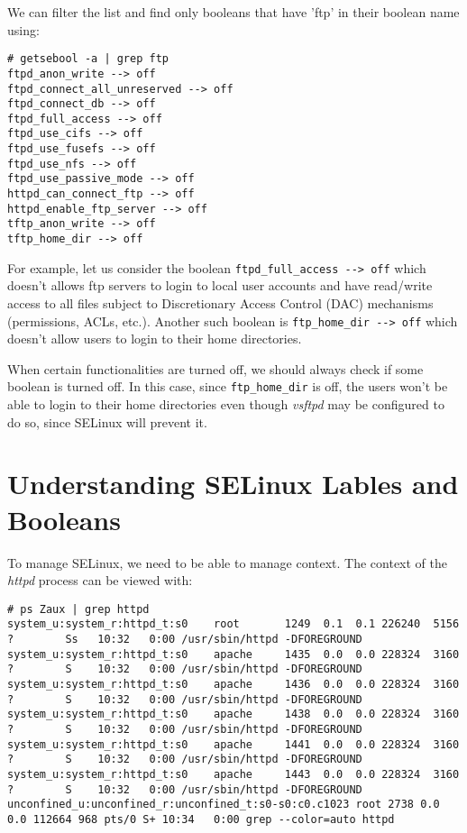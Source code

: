 \noindent
We can filter the list and find only booleans that have 'ftp' in their boolean name using:

\vspace{-15pt}
\begin{verbatim}
# getsebool -a | grep ftp
ftpd_anon_write --> off
ftpd_connect_all_unreserved --> off
ftpd_connect_db --> off
ftpd_full_access --> off
ftpd_use_cifs --> off
ftpd_use_fusefs --> off
ftpd_use_nfs --> off
ftpd_use_passive_mode --> off
httpd_can_connect_ftp --> off
httpd_enable_ftp_server --> off
tftp_anon_write --> off
tftp_home_dir --> off
\end{verbatim}
\vspace{-10pt}

\noindent
For example, let us consider the boolean \verb|ftpd_full_access --> off| which doesn't allows ftp servers to login to local user accounts and have read/write access to all files subject to Discretionary Access Control (DAC) mechanisms (permissions, ACLs, etc.). Another such boolean is \verb|ftp_home_dir --> off| which doesn't allow users to login to their home directories. 

When certain functionalities are turned off, we should always check if some boolean is turned off. In this case, since \verb|ftp_home_dir| is off, the users won't be able to login to their home directories even though \textit{vsftpd} may be configured to do so, since SELinux will prevent it. 

\section{Understanding SELinux Lables and Booleans}
To manage SELinux, we need to be able to manage context. The context of the \textit{httpd} process can be viewed with:

\vspace{-15pt}
\begin{verbatim}
# ps Zaux | grep httpd
system_u:system_r:httpd_t:s0    root       1249  0.1  0.1 226240  5156 ?        Ss   10:32   0:00 /usr/sbin/httpd -DFOREGROUND
system_u:system_r:httpd_t:s0    apache     1435  0.0  0.0 228324  3160 ?        S    10:32   0:00 /usr/sbin/httpd -DFOREGROUND
system_u:system_r:httpd_t:s0    apache     1436  0.0  0.0 228324  3160 ?        S    10:32   0:00 /usr/sbin/httpd -DFOREGROUND
system_u:system_r:httpd_t:s0    apache     1438  0.0  0.0 228324  3160 ?        S    10:32   0:00 /usr/sbin/httpd -DFOREGROUND
system_u:system_r:httpd_t:s0    apache     1441  0.0  0.0 228324  3160 ?        S    10:32   0:00 /usr/sbin/httpd -DFOREGROUND
system_u:system_r:httpd_t:s0    apache     1443  0.0  0.0 228324  3160 ?        S    10:32   0:00 /usr/sbin/httpd -DFOREGROUND
unconfined_u:unconfined_r:unconfined_t:s0-s0:c0.c1023 root 2738 0.0  0.0 112664 968 pts/0 S+ 10:34   0:00 grep --color=auto httpd
\end{verbatim}
\vspace{-10pt}

